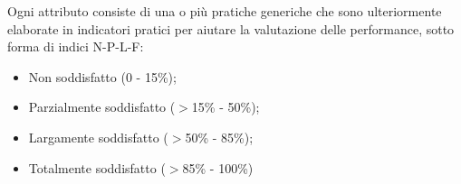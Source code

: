 \documentclass[PianoDiQualifica.tex]{subfiles}
\begin{document}
\begin{appendices}
Ogni attributo consiste di una o più pratiche generiche che sono ulteriormente elaborate in indicatori pratici per aiutare la valutazione delle performance, sotto forma di indici N-P-L-F:
\begin{itemize}
	\item Non soddisfatto (0 - 15\%);
	\item Parzialmente soddisfatto ($ > $15\% - 50\%);
	\item Largamente soddisfatto ($ > $50\% - 85\%);
	\item Totalmente soddisfatto ($ > $85\% - 100\%)
\end{itemize}

\end{appendices}
\end{document}
